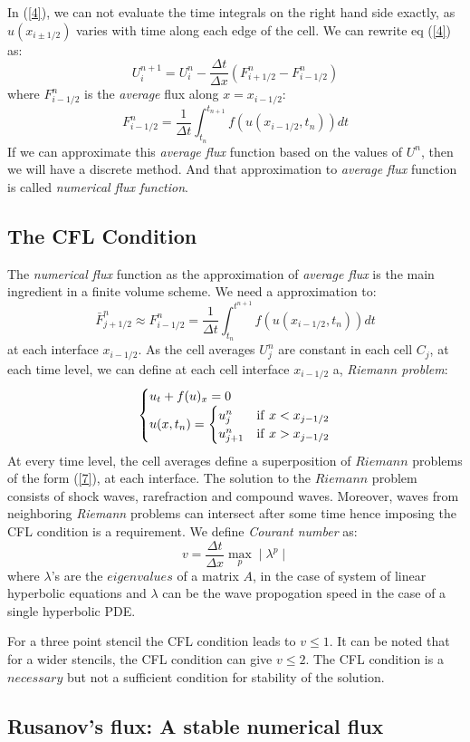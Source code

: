 \documentclass{article}
\begin{document}
In (\ref{4}), we can not evaluate the time integrals on the right hand side exactly, as $u(x_{i\pm1/2})$ varies with time along each edge of the cell. We can rewrite eq (\ref{4}) as:
\begin{equation}
U_i^{n+1} = U_i^n - \frac{\Delta t}{\Delta x} \left(F_{i+1/2}^n - F_{i-1/2}^n \right)
\end{equation}
where $F_{i-1/2}^n $ is the \textit{average} flux along $ x = x_{i-1/2}$:
\begin{equation*}
F_{i-1/2}^n  =  \frac{1}{\Delta t} \int_{t_n}^{t_{n+1}} f(u(x_{i-1/2},t_n)) dt
\end{equation*}
If we can approximate this \textit{average flux} function based on the values of $U^n$, then we will have a discrete method. And that approximation to \textit{average flux}  function is called \textit{numerical flux function}.

\subsection{The CFL Condition}
The \textit{numerical flux} function as the approximation of \textit{average flux} is the main ingredient in a finite volume scheme. We need a approximation to:
\begin{equation}
\bar{F}^n_{j+1/2} \approx F^n_{i-1/2} =  \frac{1}{\Delta t}\int_{t_n}^{t^{n+1}} f(u(x_{i-1/2}, t_n)) dt
\end{equation}
at each interface $x_{i-1/2}$. As the cell averages $U^n_j$ are constant in each cell $C_j$, at each time level, we can define at each cell interface $x_{i-1/2}$ a, \textit{Riemann problem}:
\begin{equation} \label{7}
\begin{cases}
u_t + f(u)_x = 0 \\
u(x, t_n) = & \hspace{-28pt}
\begin{cases}
u^n_j  &  \text{if} \hspace{4pt} x < x_{j-1/2} \\
u^n_{j+1} & \text{if} \hspace{4pt} x > x_{j-1/2}
\end{cases}
\end{cases}
\end{equation}
At every time level, the cell averages define a superposition of $Riemann$ problems of the form (\ref{7}), at each interface. The solution to the $Riemann$ problem consists of shock waves, rarefraction and compound waves. Moreover, waves from neighboring \textit{Riemann} problems can intersect after some time hence imposing the CFL condition is a requirement. We define \textit{Courant number} as:
\begin{equation} \label{8}
v = \frac{\Delta t}{\Delta x} \max_p\mid\lambda^p\mid
\end{equation}
where $\lambda$'s are the $eigenvalues$ of a matrix $A$, in the case of system of linear hyperbolic equations and $\lambda$ can be the wave propogation speed in the case of a single hyperbolic PDE.

For a three point stencil the CFL condition leads to $v \leq 1$. It can be noted that for a wider stencils, the CFL condition can give $v \leq 2$. The CFL condition is a $necessary$ but not a sufficient condition for stability of the solution.
\subsection{Rusanov's flux: A stable numerical flux}
\end{document}
